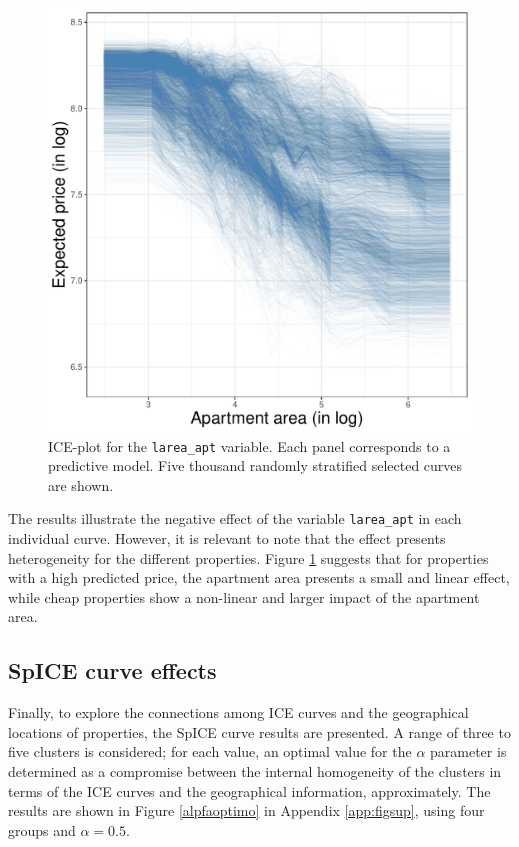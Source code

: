 \documentclass[smallextended,natbib]{svjour3}\usepackage[]{graphicx}\usepackage[]{xcolor}
\begin{document}
\begin{figure} 
    \centering
    \includegraphics[scale=0.5]{figures/fig-ice-sup-decRF.pdf}
    \caption{ICE-plot for the \texttt{larea\_apt} variable. Each panel corresponds to a predictive model. Five thousand randomly stratified selected curves are shown.}
    \label{fig-icesupRF}
\end{figure}

The results illustrate the negative effect of the variable \texttt{larea\_apt} in each individual curve. However, it is relevant to note that the effect  presents  heterogeneity for the different properties. Figure \ref{fig-icesupRF} suggests that for properties with a high predicted price, the apartment area presents a small and linear effect, while cheap properties show a non-linear and larger impact of the apartment area. 

\subsection{SpICE curve effects} \label{results-ice}
Finally, to explore the connections among ICE curves and the geographical locations of properties, the SpICE curve results are presented.  
A range of three to five clusters is considered; for each value, an optimal value for the $\alpha$ parameter is determined as a compromise between the internal homogeneity of the clusters in terms of the ICE curves and the geographical information, approximately. The results are shown in Figure \ref{alpfaoptimo} in Appendix \ref{app:figsup}, using four groups and $\alpha = 0.5$.
\end{document}
